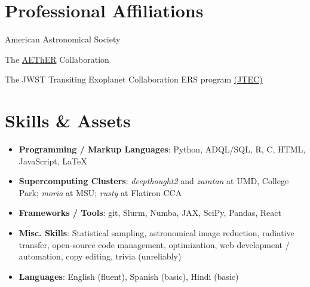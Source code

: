 \documentclass[letterpaper,10.5pt]{article}
\newcommand{\resumeSubHeadingListStart}{\begin{itemize}[leftmargin=*]}
\newcommand{\resumeSubHeadingListEnd}{\end{itemize}}
\newcommand{\shorterSection}[1]{\vspace{-10pt}\section{#1}}
\begin{document}
\shorterSection{Professional Affiliations}
\small
  \begin{list}{}{\cvlist}
  \item[{\color{numcolor}}]American Astronomical Society
  \item[{\color{numcolor}}]The \href{https://planets.carnegiescience.edu/}{AEThER} Collaboration
  \item[{\color{numcolor}}]The JWST Transiting Exoplanet Collaboration ERS program \href{https://ers-transit.github.io/}{(JTEC)}



  \end{list}


\shorterSection{Skills \& Assets}
  \resumeSubHeadingListStart
  \small
    \item{
     \textbf{Programming / Markup Languages}{: Python, ADQL/SQL, R, C, HTML, JavaScript, \LaTeX}
    }
    \vspace{-5pt}
    \item{
     \textbf{Supercomputing Clusters}{: \textit{deepthought2} and \textit{zaratan} at UMD, College Park; \textit{moria} at MSU; \textit{rusty} at Flatiron CCA}
    }
    \vspace{-5pt}
    \item{
     \textbf{Frameworks / Tools}{: git, Slurm, Numba, JAX, SciPy, Pandas, React}
    }
    \vspace{-5pt}
    \item{
     \textbf{Misc. Skills}{: Statistical sampling, astronomical image reduction, radiative transfer, open-source code management, optimization, web development / automation, copy editing, trivia (unreliably)}
    }
    \vspace{-5pt}
    \item{
     \textbf{Languages}{: English (fluent), Spanish (basic), Hindi (basic)}
    }
\resumeSubHeadingListEnd
\end{document}

